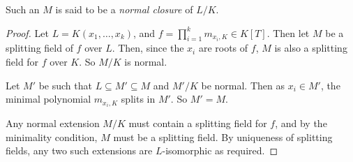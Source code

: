 Such an \( M \) is said to be a \emph{normal closure} of \( L / K \).
\begin{proof}
	Let \( L = K(x_1, \dots, x_k) \), and \( f = \prod_{i=1}^k m_{x_i,K} \in K[T] \).
	Then let \( M \) be a splitting field of \( f \) over \( L \).
	Then, since the \( x_i \) are roots of \( f \), \( M \) is also a splitting field for \( f \) over \( K \).
	So \( M / K \) is normal.

	Let \( M' \) be such that \( L \subseteq M' \subseteq M \) and \( M' / K \) be normal.
	Then as \( x_i \in M' \), the minimal polynomial \( m_{x_i,K} \) splits in \( M' \).
	So \( M' = M \).

	Any normal extension \( M / K \) must contain a splitting field for \( f \), and by the minimality condition, \( M \) must be a splitting field.
	By uniqueness of splitting fields, any two such extensions are \( L \)-isomorphic as required.
\end{proof}

